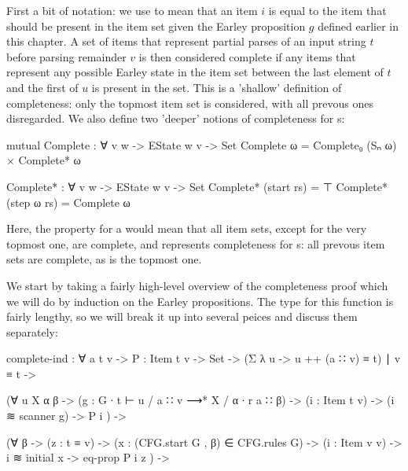 		First a bit of notation: we use  to mean that an item $i$
		is equal to the item that should be present in the item set given the
		Earley proposition $g$ defined earlier in this chapter. A set of items
		that represent partial parses of an input string $t$ before parsing
		remainder $v$ is then considered complete if any items that represent
		any possible Earley state in the item set between the last element of
		$t$ and the first of $u$ is present in the set. This is a 'shallow'
		definition of completeness: only the topmost item set is considered,
		with all prevous ones disregarded. We also define two 'deeper' notions of
		completeness for s:

		\begin{code}
			  mutual
			    Complete : ∀ {v w} -> EState w v -> Set
			    Complete ω = Complete₀ (Sₙ ω) × Complete* ω
			  
			    Complete* : ∀ {v w} -> EState w v -> Set
			    Complete* (start rs) = ⊤
			    Complete* (step ω rs) = Complete ω
		\end{code}

		Here, the  property for a  would mean
		that all item sets, except for the very topmost one, are complete, and
		 represents completeness for s: all
		prevous item sets are complete, as is the topmost one.

		We start by taking a fairly high-level overview of the completeness
		proof which we will do by induction on the Earley propositions. The
		type for this function is fairly lengthy, so we will break it up into
		several peices and discuss them separately:

		\begin{code}
			  complete-ind : ∀ {a t v} ->
			    {P : Item t v -> Set} ->
			    (Σ λ u -> u ++ (a ∷ v) ≡ t) ∣ v ≡ t ->
			
			    (∀ {u X α β} ->
			      (g : G ∙ t ⊢ u / a ∷ v ⟶* X / α ∙ r a ∷ β) ->
			      (i : Item t v) -> (i ≋ scanner g) ->
			      P i
			    ) ->
			
			    (∀ {β} ->
			      (z : t ≡ v) ->
			      (x : (CFG.start G , β) ∈ CFG.rules G) ->
			      (i : Item v v) ->
			      i ≋ initial x -> eq-prop P i z
			    ) ->
		\end{code}

